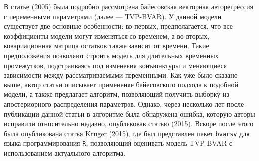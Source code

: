 В статье  (2005) была подробно рассмотрена байесовская векторная авторегрессия с переменными параметрами (далее --- TVP-BVAR).  У данной модели существует две основные особенности: во-первых, предполагается, что все коэффициенты модели могут изменяться со временем, а во-вторых, ковариационная матрица остатков также зависит от времени. Такие предположения позволяют строить модель для длительных временных промежутков, подстраиваясь под изменения конъюнктуры и меняющиеся зависимости между рассматриваемыми переменными. Как уже было сказано выше, автор статьи описывает применение байесовского подхода к подобной модели, а также предлагает алгоритм, позволяющий получить выборку из апостериорного распределения параметров. Однако, через несколько лет после публикации данной статьи в алгоритме была обнаружена ошибка, которую авторы исправили относительно недавно, опубликовав статью  (2015).  Вскоре после этого была опубликована статья Kruger (2015), где был представлен пакет \texttt{bvarsv} для языка программирования \texttt{R}, позволяющий оценивать модель TVP-BVAR с использованием актуального алгоритма.
